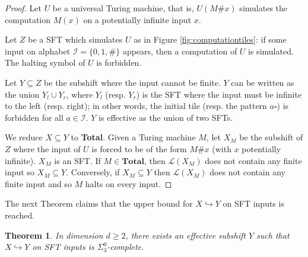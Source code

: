 \documentclass[a4paper]{article}
\newcommand{\Le}{\mathcal{L}}
\newtheorem{theorem}{Theorem}[section]
\theoremstyle{definition}
\begin{document}
\begin{proof}
Let $U$ be a universal Turing machine, that is, $U(M\#x)$ simulates the computation $M(x)$ on a potentially infinite input $x$.

Let $Z$ be a SFT which simulates $U$ as in Figure \ref{fig:computationtiles}: 
if some input on alphabet $\mathcal I = \{0,1,\#\}$ appears, then a computation of $U$ is simulated. The halting symbol of $U$ is forbidden. 
    
Let $Y\subseteq Z$ be the subshift where the input cannot be finite. $Y$ can be written as the union $Y_l \cup Y_r$, where $Y_l$ (resp. $Y_r$) is the SFT where the input must be infinite to the left (resp. right); in other words, the initial tile (resp. the pattern $a\square$) is forbidden for all $a\in \mathcal I$. $Y$ is effective as the union of two SFTs.

We reduce $X\subseteq Y$ to \textbf{Total}. Given a Turing machine $M$, let $X_M$ be the subshift of $Z$ where the input of $U$ is forced to be of the form $M\#x$ (with $x$ potentially infinite). $X_M$ is an SFT.
If $M \in \textbf{Total}$, then $\Le(X_M)$ does not contain any finite input so $X_M \subseteq Y$. Conversely, if $X_M \subseteq Y$ then $\Le(X_M)$ does not contain any finite input and so $M$ halts on every input.
\end{proof}

The next Theorem claims that the upper bound for $X \hookrightarrow Y$ on SFT inputs is reached.

\begin{theorem}
    In dimension $d \ge 2$, there exists an effective subshift $Y$ such that $X \hookrightarrow Y$ on SFT inputs is $\Sigma^0_3$-complete.
\end{theorem}
\end{document}
